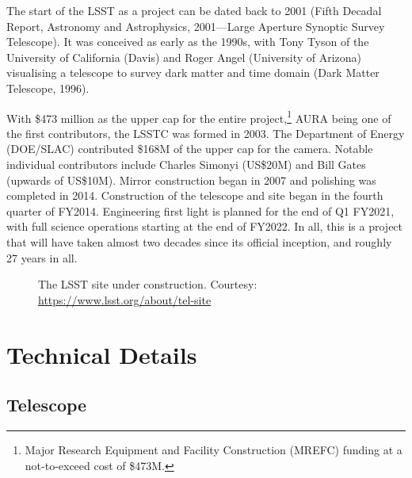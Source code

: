 \documentclass[12pt,a4paper]{article}
\begin{document}
The start of the LSST as a project can be dated back to 2001 (Fifth Decadal
Report, Astronomy and Astrophysics, 2001---Large Aperture Synoptic Survey
Telescope). It was conceived as early as the 1990s, with Tony Tyson of the
University of California (Davis) and Roger Angel (University of Arizona)
visualising a telescope to survey dark matter and time domain (Dark Matter
Telescope, 1996).

With \$473 million as the upper cap for the entire project,\footnote{Major
Research Equipment and Facility Construction (MREFC) funding at a not-to-exceed
cost of \$473M.} AURA being one of the first contributors, the LSSTC was formed
in 2003. The Department of Energy (DOE/SLAC) contributed \$168M of the upper
cap for the camera. Notable individual contributors include Charles Simonyi
(US\$20M) and Bill Gates (upwards of US\$10M). Mirror construction began in
2007 and polishing was completed in 2014. Construction of the telescope and
site began in the fourth quarter of FY2014. Engineering first light is planned
for the end of Q1 FY2021, with full science operations starting at the end of
FY2022. In all, this is a project that will have taken almost two decades since
its official inception, and roughly 27 years in all.

\begin{figure}[htbp]
  \centering
  \caption{The LSST site under construction.
           Courtesy: \url{https://www.lsst.org/about/tel-site}}
  \label{fig:construction}
\end{figure}

\section{Technical Details}

\subsection{Telescope}
\end{document}
